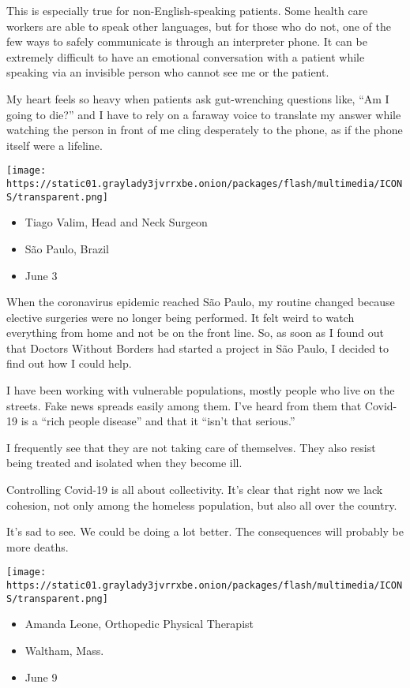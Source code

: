 This is especially true for non-English-speaking patients. Some health
care workers are able to speak other languages, but for those who do
not, one of the few ways to safely communicate is through an interpreter
phone. It can be extremely difficult to have an emotional conversation
with a patient while speaking via an invisible person who cannot see me
or the patient.

My heart feels so heavy when patients ask gut-wrenching questions like,
``Am I going to die?'' and I have to rely on a faraway voice to
translate my answer while watching the person in front of me cling
desperately to the phone, as if the phone itself were a lifeline.

\texttt{[image: https://static01.graylady3jvrrxbe.onion/packages/flash/multimedia/ICONS/transparent.png]}

\begin{itemize}
\tightlist
\item
  Tiago Valim, Head and Neck Surgeon
\item
  São Paulo, Brazil
\item
  June 3
\end{itemize}

When the coronavirus epidemic reached São Paulo, my routine changed
because elective surgeries were no longer being performed. It felt weird
to watch everything from home and not be on the front line. So, as soon
as I found out that Doctors Without Borders had started a project in São
Paulo, I decided to find out how I could help.

I have been working with vulnerable populations, mostly people who live
on the streets. Fake news spreads easily among them. I've heard from
them that Covid-19 is a ``rich people disease'' and that it ``isn't that
serious.''

I frequently see that they are not taking care of themselves. They also
resist being treated and isolated when they become ill.

Controlling Covid-19 is all about collectivity. It's clear that right
now we lack cohesion, not only among the homeless population, but also
all over the country.

It's sad to see. We could be doing a lot better. The consequences will
probably be more deaths.

\texttt{[image: https://static01.graylady3jvrrxbe.onion/packages/flash/multimedia/ICONS/transparent.png]}

\begin{itemize}
\tightlist
\item
  Amanda Leone, Orthopedic Physical Therapist
\item
  Waltham, Mass.
\item
  June 9
\end{itemize}

